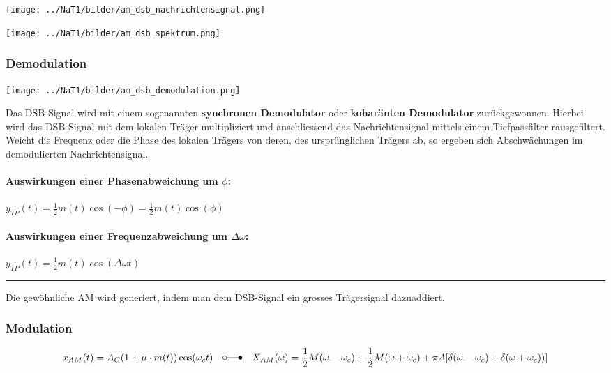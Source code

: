 \begin{minipage}[t]{9.5cm}
    \texttt{[image: ../NaT1/bilder/am\_dsb\_nachrichtensignal.png]}
\end{minipage}
\begin{minipage}[t]{9cm}
    \texttt{[image: ../NaT1/bilder/am\_dsb\_spektrum.png]}
\end{minipage}

\subsubsection{Demodulation} 
\label{am_dsb_modulation}
\begin{minipage}[t][2.3cm][c]{6.5cm}
    \texttt{[image: ../NaT1/bilder/am\_dsb\_demodulation.png]}
\end{minipage}
\begin{minipage}[t][2.3cm][c]{11.5cm}
	Das DSB-Signal wird mit einem sogenannten \textbf{synchronen Demodulator} oder \textbf{koharänten
	Demodulator} zurückgewonnen. Hierbei wird das DSB-Signal mit dem lokalen Träger
	multipliziert und anschliessend das Nachrichtensignal mittels einem Tiefpassfilter rausgefiltert.
	\\ Weicht die Frequenz oder die Phase des lokalen Trägers von deren, des ursprünglichen Trägers ab, 
	so ergeben sich Abschwächungen im demodulierten Nachrichtensignal.
\end{minipage}

\paragraph{Auswirkungen einer Phasenabweichung um $\phi$:} $y_{TP}(t) = \frac{1}{2}
m(t) \cos(-\phi)= \frac{1}{2} m(t) \cos(\phi) $
\paragraph{Auswirkungen einer Frequenzabweichung um $\Delta \omega$:} $y_{TP}(t) =
\frac{1}{2} m(t) \cos(\Delta \omega t)$\\


\hrule
{}
Die gewöhnliche AM wird generiert, indem man dem DSB-Signal ein grosses Trägersignal dazuaddiert.

\subsubsection{Modulation}

$$x_{AM}(t) = A_C (1 + \mu \cdot m(t)) \cos(\omega_c t)
	\quad \laplace \quad X_{AM}(\omega) = \frac{1}{2}M(\omega - \omega_c) + \frac{1}{2}M(\omega + \omega_c)
	+ \pi A [\delta (\omega - \omega_c) + \delta (\omega + \omega_c))]$$

